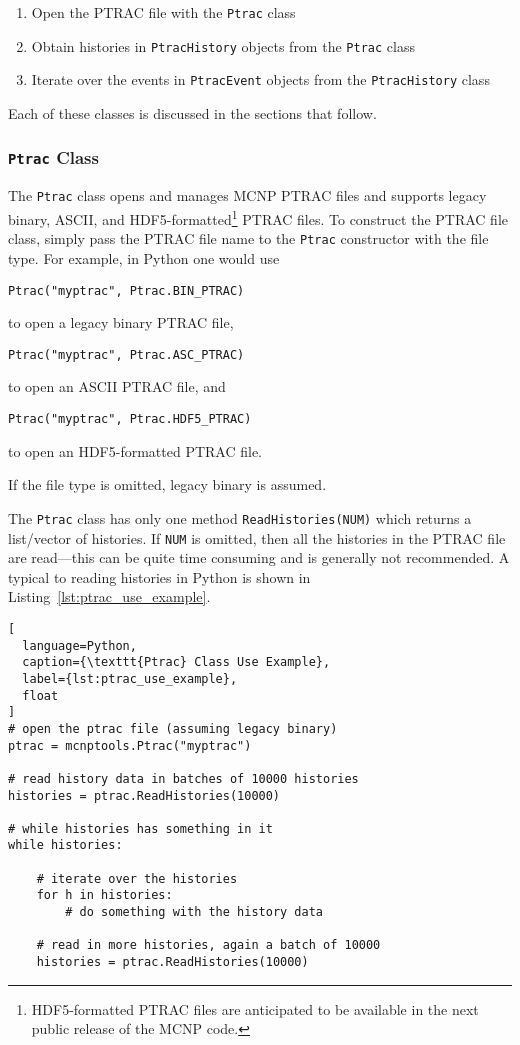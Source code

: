 \documentclass[11pt]{article}
\begin{document}
\begin{enumerate}
  \item Open the PTRAC file with the \texttt{Ptrac} class
  \item Obtain histories in \texttt{PtracHistory} objects from the \texttt{Ptrac} class
  \item Iterate over the events in \texttt{PtracEvent} objects from the \texttt{PtracHistory} class
\end{enumerate}

Each of these classes is discussed in the sections that follow.

\subsubsection{\texttt{Ptrac} Class}\label{the-ptrac-class}

The \texttt{Ptrac} class opens and manages MCNP PTRAC files and supports legacy
binary, ASCII, and HDF5-formatted\footnote{HDF5-formatted PTRAC files are
anticipated to be available in the next public release of the MCNP code.} PTRAC
files. To construct the PTRAC file class, simply pass the PTRAC file name to the
\texttt{Ptrac} constructor with the file type. For example, in Python one would
use
\begin{lstlisting}
Ptrac("myptrac", Ptrac.BIN_PTRAC)
\end{lstlisting}
to open a legacy binary PTRAC file,
\begin{lstlisting}
Ptrac("myptrac", Ptrac.ASC_PTRAC)
\end{lstlisting}
to open an ASCII PTRAC file, and
\begin{lstlisting}
Ptrac("myptrac", Ptrac.HDF5_PTRAC)
\end{lstlisting}
to open an HDF5-formatted PTRAC file.

If the file type is omitted, legacy binary is assumed.

The \texttt{Ptrac} class has only one method \texttt{ReadHistories(NUM)} which
returns a list/vector of histories. If \texttt{NUM} is omitted, then all the
histories in the PTRAC file are read---this can be quite time consuming and is
generally not recommended. A typical to reading histories in Python is shown in
Listing~\ref{lst:ptrac_use_example}.

\begin{lstlisting}[
  language=Python,
  caption={\texttt{Ptrac} Class Use Example},
  label={lst:ptrac_use_example},
  float
]
# open the ptrac file (assuming legacy binary)
ptrac = mcnptools.Ptrac("myptrac")

# read history data in batches of 10000 histories
histories = ptrac.ReadHistories(10000)

# while histories has something in it
while histories:

    # iterate over the histories
    for h in histories:
        # do something with the history data

    # read in more histories, again a batch of 10000
    histories = ptrac.ReadHistories(10000)
\end{lstlisting}
\end{document}
